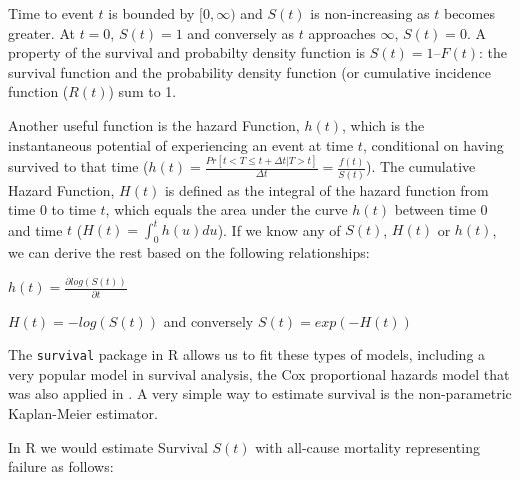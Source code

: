 \documentclass[
]{book}
\newenvironment{Shaded}{\begin{snugshade}}{\end{snugshade}}
\newcommand{\FunctionTok}[1]{\textcolor[rgb]{0.00,0.00,0.00}{#1}}
\newcommand{\NormalTok}[1]{#1}
\newcommand{\OtherTok}[1]{\textcolor[rgb]{0.56,0.35,0.01}{#1}}
\newcommand{\SpecialCharTok}[1]{\textcolor[rgb]{0.00,0.00,0.00}{#1}}
\begin{document}
Time to event \(t\) is bounded by \([0,\infty)\) and \(S(t)\) is non-increasing as \(t\) becomes greater. At \(t=0\), \(S(t)=1\) and conversely as \(t\) approaches \(\infty\), \(S(t)=0\). A property of the survival and probabilty density function is \(S(t) = 1 – F(t)\): the survival function and the probability density function (or cumulative incidence function (\(R(t)\)) sum to 1.

Another useful function is the hazard Function, \(h(t)\), which is the instantaneous potential of experiencing an event at time \(t\), conditional on having survived to that time (\(h(t)=\frac{Pr[t<T\leq t+\Delta t|T>t]}{\Delta t}=\frac{f(t)}{S(t)}\)). The cumulative Hazard Function, \(H(t)\) is defined as the integral of the hazard function from time \(0\) to time \(t\), which equals the area under the curve \(h(t)\) between time \(0\) and time \(t\) (\(H(t)=\int_{0}^{t}h(u)du\)).
If we know any of \(S(t)\), \(H(t)\) or \(h(t)\), we can derive the rest based on the following relationships:

\(h(t)=\frac{\partial log(S(t))}{\partial t}\)

\(H(t)=-log(S(t))\) and conversely \(S(t)=exp(-H(t))\)

The \texttt{survival} package in R allows us to fit these types of models, including a very popular model in survival analysis, the Cox proportional hazards model that was also applied in \citet{wong1989risk}. A very simple way to estimate survival is the non-parametric Kaplan-Meier estimator.

In R we would estimate Survival \(S(t)\) with all-cause mortality representing failure as follows:

\begin{Shaded}
\end{Shaded}
\end{document}
